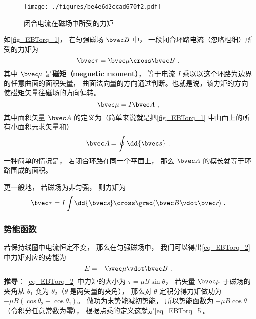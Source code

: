 
\begin{figure}[ht]
\centering
\texttt{[image: ./figures/be4e6d2ccad670f2.pdf]}
\caption{闭合电流在磁场中所受的力矩} \label{fig_EBTorq_1}
\end{figure}

如\autoref{fig_EBTorq_1}， 在匀强磁场 $\bvec B$ 中， 一段闭合环路电流（忽略粗细）所受的力矩为
\begin{equation}\label{eq_EBTorq_2}
\bvec \tau = \bvec \mu \cross \bvec B~.
\end{equation}
其中 $\bvec \mu$ 是\textbf{磁矩（megnetic moment）}， 等于电流 $I$ 乘以以这个环路为边界的任意曲面的面积矢量， 曲面法向量的方向通过判断。也就是说，该力矩的方向使磁矩矢量往磁场的方向偏转。
\begin{equation}
\bvec \mu = I \bvec A~,
\end{equation}
其中面积矢量 $\bvec A$ 的定义为（简单来说就是把\autoref{fig_EBTorq_1} 中曲面上的所有小面积元求矢量和）
\begin{equation}
\bvec A = \oint \dd{\bvec s}~.
\end{equation}
一种简单的情况是， 若闭合环路在同一个平面上， 那么 $\bvec A$ 的模长就等于环路围成的面积。

更一般地， 若磁场为非匀强， 则力矩为
\begin{equation}\label{eq_EBTorq_1}
\bvec \tau = I \int \dd{\bvec s}\cross\grad(\bvec B\vdot\bvec r)~.
\end{equation}

\subsubsection{势能函数}
若保持线圈中电流恒定不变， 那么在匀强磁场中， 我们可以得出\autoref{eq_EBTorq_2} 中力矩对应的势能为
\begin{equation}\label{eq_EBTorq_5}
E = -\bvec\mu \vdot \bvec B~.
\end{equation}
\textbf{推导}： \autoref{eq_EBTorq_2} 中力矩的大小为 $\tau = \mu B\sin\theta$， 若矢量 $\bvec\mu$ 于磁场的夹角从 $\theta_1$ 变为 $\theta_2$（$\theta$ 是两矢量的夹角）， 那么对 $\theta$ 定积分得力矩做功为 $-\mu B(\cos\theta_2-\cos\theta_1)$。 做功为末势能减初势能， 所以势能函数为 $-\mu B\cos\theta$（令积分任意常数为零）， 根据点乘的定义这就是\autoref{eq_EBTorq_5}。

